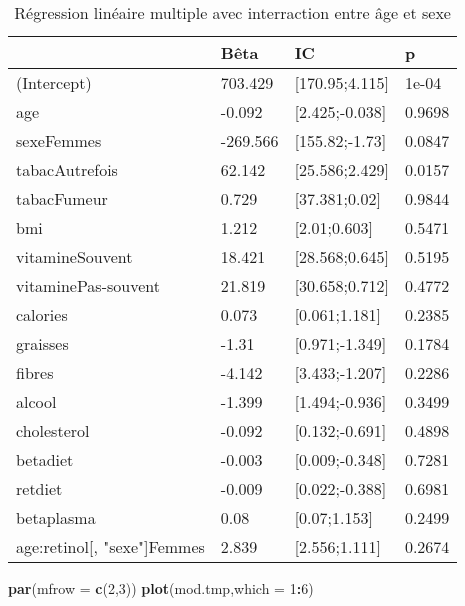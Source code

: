 \documentclass[]{article}
\newenvironment{Shaded}{\begin{snugshade}}{\end{snugshade}}
\newcommand{\KeywordTok}[1]{\textcolor[rgb]{0.13,0.29,0.53}{\textbf{#1}}}
\newcommand{\DataTypeTok}[1]{\textcolor[rgb]{0.13,0.29,0.53}{#1}}
\newcommand{\DecValTok}[1]{\textcolor[rgb]{0.00,0.00,0.81}{#1}}
\newcommand{\OperatorTok}[1]{\textcolor[rgb]{0.81,0.36,0.00}{\textbf{#1}}}
\newcommand{\NormalTok}[1]{#1}
\begin{document}
\begin{table}

\caption{\label{tab:unnamed-chunk-48}Régression linéaire multiple avec interraction entre âge et sexe}
\centering
\begin{tabular}[t]{l|l|l|l}
\hline
 & Bêta & IC & p\\
\hline
\rowcolor[HTML]{BBD2E1}  (Intercept) & 703.429 & [170.95;4.115] & 1e-04\\
\hline
age & -0.092 & [2.425;-0.038] & 0.9698\\
\hline
\rowcolor[HTML]{BBD2E1}  sexeFemmes & -269.566 & [155.82;-1.73] & 0.0847\\
\hline
tabacAutrefois & 62.142 & [25.586;2.429] & 0.0157\\
\hline
\rowcolor[HTML]{BBD2E1}  tabacFumeur & 0.729 & [37.381;0.02] & 0.9844\\
\hline
bmi & 1.212 & [2.01;0.603] & 0.5471\\
\hline
\rowcolor[HTML]{BBD2E1}  vitamineSouvent & 18.421 & [28.568;0.645] & 0.5195\\
\hline
vitaminePas-souvent & 21.819 & [30.658;0.712] & 0.4772\\
\hline
\rowcolor[HTML]{BBD2E1}  calories & 0.073 & [0.061;1.181] & 0.2385\\
\hline
graisses & -1.31 & [0.971;-1.349] & 0.1784\\
\hline
\rowcolor[HTML]{BBD2E1}  fibres & -4.142 & [3.433;-1.207] & 0.2286\\
\hline
alcool & -1.399 & [1.494;-0.936] & 0.3499\\
\hline
\rowcolor[HTML]{BBD2E1}  cholesterol & -0.092 & [0.132;-0.691] & 0.4898\\
\hline
betadiet & -0.003 & [0.009;-0.348] & 0.7281\\
\hline
\rowcolor[HTML]{BBD2E1}  retdiet & -0.009 & [0.022;-0.388] & 0.6981\\
\hline
betaplasma & 0.08 & [0.07;1.153] & 0.2499\\
\hline
\rowcolor[HTML]{BBD2E1}  age:retinol[, "sexe"]Femmes & 2.839 & [2.556;1.111] & 0.2674\\
\hline
\end{tabular}
\end{table}

\begin{Shaded}
\begin{Highlighting}[]
\KeywordTok{par}\NormalTok{(}\DataTypeTok{mfrow =} \KeywordTok{c}\NormalTok{(}\DecValTok{2}\NormalTok{,}\DecValTok{3}\NormalTok{))}
\KeywordTok{plot}\NormalTok{(mod.tmp,}\DataTypeTok{which =} \DecValTok{1}\OperatorTok{:}\DecValTok{6}\NormalTok{)}
\end{Highlighting}
\end{Shaded}
\end{document}
